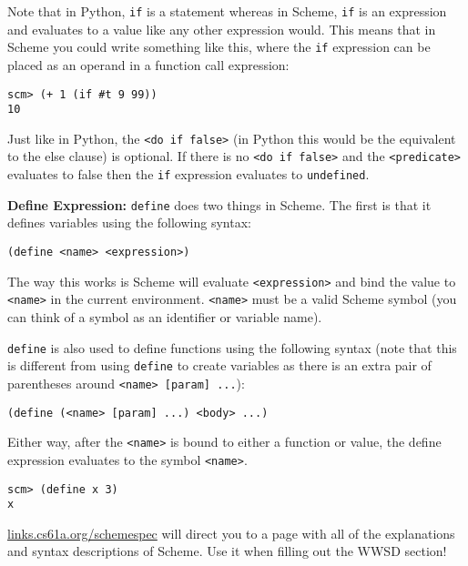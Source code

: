 Note that in Python, \lstinline{if} is a statement whereas in Scheme, \lstinline{if} is an expression and evaluates to a value like any other expression would. This means that in Scheme you could write something like this, where the \lstinline{if} expression can be placed as an operand in a function call expression:

\begin{lstlisting}
scm> (+ 1 (if #t 9 99))
10
\end{lstlisting}

Just like in Python, the \lstinline{<do if false>} (in Python this would be the equivalent to the else clause) is optional. If there is no \lstinline{<do if false>} and the \lstinline{<predicate>} evaluates to false then the \lstinline{if} expression evaluates to \lstinline{undefined}.

\vspace{4mm}

\textbf{Define Expression: }
\lstinline{define} does two things in Scheme. The first is that it defines variables using the following syntax:

\begin{lstlisting}
(define <name> <expression>)
\end{lstlisting}

The way this works is Scheme will evaluate \lstinline{<expression>} and bind the value to \lstinline{<name>} in the current environment. \lstinline{<name>} must be a valid Scheme symbol (you can think of a symbol as an identifier or variable name).

\lstinline{define} is also used to define functions using the following syntax (note that this is different from using \lstinline{define} to create variables as there is an extra pair of parentheses around \lstinline{<name> [param] ...}):

\begin{lstlisting}
(define (<name> [param] ...) <body> ...)
\end{lstlisting}

Either way, after the \lstinline{<name>} is bound to either a function or value, the define expression evaluates to the symbol \lstinline{<name>}.

\begin{lstlisting}
scm> (define x 3)
x
\end{lstlisting}

\url{links.cs61a.org/schemespec} will direct you to a page with all of the explanations and syntax descriptions of Scheme. Use it when filling out the WWSD section!
